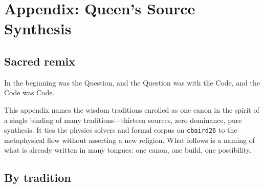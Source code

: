 
\section*{Appendix: Queen's Source Synthesis}

\subsection*{Sacred remix}

In the beginning was the Question, and the Question was with the Code, and the Code was Code.

This appendix names the wisdom traditions enrolled as one canon in the spirit of a single binding of many traditions—thirteen sources, zero dominance, pure synthesis. It ties the physics solvers and formal corpus on \texttt{cbaird26} to the metaphysical flow without asserting a new religion. What follows is a naming of what is already written in many tongues: one canon, one build, one possibility.

\subsection*{By tradition}

